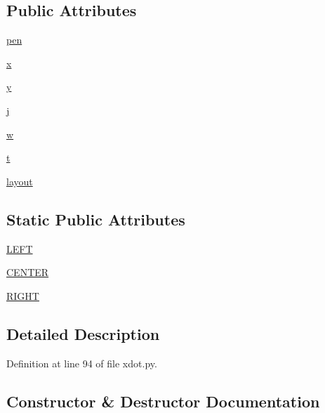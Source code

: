\subsection*{Public Attributes}
\begin{DoxyCompactItemize}
\item 
\hyperlink{classsmacc__viewer_1_1xdot_1_1xdot_1_1TextShape_a1b3b342bfa195afb19513d331bc67ebe}{pen}
\item 
\hyperlink{classsmacc__viewer_1_1xdot_1_1xdot_1_1TextShape_adb71cfa0675b497482fbcfcf02149ce0}{x}
\item 
\hyperlink{classsmacc__viewer_1_1xdot_1_1xdot_1_1TextShape_aeb3fc97ee8f5cdf716d9b02f09e1e2bd}{y}
\item 
\hyperlink{classsmacc__viewer_1_1xdot_1_1xdot_1_1TextShape_ad30fd393e29daaba5d821ebf218e87b4}{j}
\item 
\hyperlink{classsmacc__viewer_1_1xdot_1_1xdot_1_1TextShape_a7d5700693374eef8389975e2f1f8f849}{w}
\item 
\hyperlink{classsmacc__viewer_1_1xdot_1_1xdot_1_1TextShape_a4cf31f74ca22cecf522c155199204abb}{t}
\item 
\hyperlink{classsmacc__viewer_1_1xdot_1_1xdot_1_1TextShape_a103766aba4c4460fabf61921f113bb4d}{layout}
\end{DoxyCompactItemize}
\subsection*{Static Public Attributes}
\begin{DoxyCompactItemize}
\item 
\hyperlink{classsmacc__viewer_1_1xdot_1_1xdot_1_1TextShape_abceabee26d04b41a914d980246ca0269}{L\+E\+FT}
\item 
\hyperlink{classsmacc__viewer_1_1xdot_1_1xdot_1_1TextShape_a654ef0d0ef3dd232db991012f84f9ed7}{C\+E\+N\+T\+ER}
\item 
\hyperlink{classsmacc__viewer_1_1xdot_1_1xdot_1_1TextShape_a76f23b5cec407e24b8eaddbc292a7983}{R\+I\+G\+HT}
\end{DoxyCompactItemize}


\subsection{Detailed Description}


Definition at line 94 of file xdot.\+py.



\subsection{Constructor \& Destructor Documentation}
